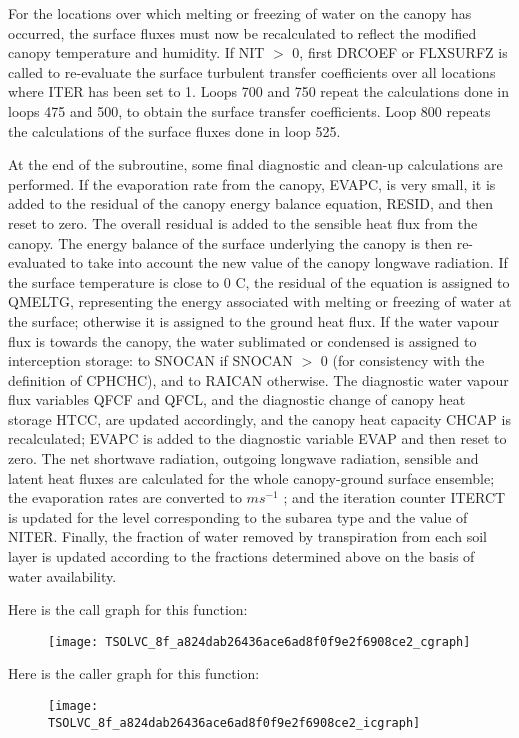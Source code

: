 For the locations over which melting or freezing of water on the canopy has occurred, the surface fluxes must now be recalculated to reflect the modified canopy temperature and humidity. If N\+I\+T $>$ 0, first D\+R\+C\+O\+E\+F or F\+L\+X\+S\+U\+R\+F\+Z is called to re-\/evaluate the surface turbulent transfer coefficients over all locations where I\+T\+E\+R has been set to 1. Loops 700 and 750 repeat the calculations done in loops 475 and 500, to obtain the surface transfer coefficients. Loop 800 repeats the calculations of the surface fluxes done in loop 525.

At the end of the subroutine, some final diagnostic and clean-\/up calculations are performed. If the evaporation rate from the canopy, E\+V\+A\+P\+C, is very small, it is added to the residual of the canopy energy balance equation, R\+E\+S\+I\+D, and then reset to zero. The overall residual is added to the sensible heat flux from the canopy. The energy balance of the surface underlying the canopy is then re-\/evaluated to take into account the new value of the canopy longwave radiation. If the surface temperature is close to 0 C, the residual of the equation is assigned to Q\+M\+E\+L\+T\+G, representing the energy associated with melting or freezing of water at the surface; otherwise it is assigned to the ground heat flux. If the water vapour flux is towards the canopy, the water sublimated or condensed is assigned to interception storage\+: to S\+N\+O\+C\+A\+N if S\+N\+O\+C\+A\+N $>$ 0 (for consistency with the definition of C\+P\+H\+C\+H\+C), and to R\+A\+I\+C\+A\+N otherwise. The diagnostic water vapour flux variables Q\+F\+C\+F and Q\+F\+C\+L, and the diagnostic change of canopy heat storage H\+T\+C\+C, are updated accordingly, and the canopy heat capacity C\+H\+C\+A\+P is recalculated; E\+V\+A\+P\+C is added to the diagnostic variable E\+V\+A\+P and then reset to zero. The net shortwave radiation, outgoing longwave radiation, sensible and latent heat fluxes are calculated for the whole canopy-\/ground surface ensemble; the evaporation rates are converted to $m s^{-1}$ ; and the iteration counter I\+T\+E\+R\+C\+T is updated for the level corresponding to the subarea type and the value of N\+I\+T\+E\+R. Finally, the fraction of water removed by transpiration from each soil layer is updated according to the fractions determined above on the basis of water availability.

Here is the call graph for this function\+:\nopagebreak
\begin{figure}[H]
\begin{center}
\leavevmode
\texttt{[image: TSOLVC\_8f\_a824dab26436ace6ad8f0f9e2f6908ce2\_cgraph]}
\end{center}
\end{figure}




Here is the caller graph for this function\+:\nopagebreak
\begin{figure}[H]
\begin{center}
\leavevmode
\texttt{[image: TSOLVC\_8f\_a824dab26436ace6ad8f0f9e2f6908ce2\_icgraph]}
\end{center}
\end{figure}


